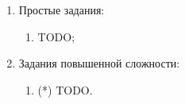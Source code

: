 
\begin{enumerate}

	\item Простые задания:

	\begin{enumerate}

		\item TODO;

	\end{enumerate}

	\item Задания повышенной сложности:

	\begin{enumerate}

		\item (*) TODO.

	\end{enumerate}

\end{enumerate}

